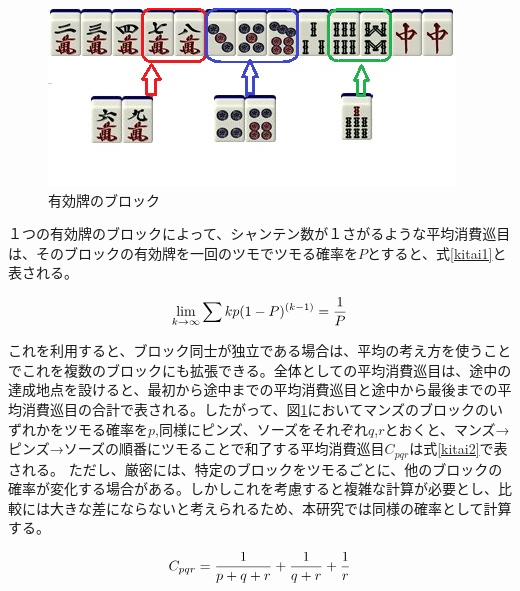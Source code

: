 \begin{figure}[h]
 \centering
 \includegraphics[keepaspectratio, scale=1,bb=0 0 320 194]
      {img/block.jpg}
 \caption{有効牌のブロック}
 \label{block}
\end{figure}

１つの有効牌のブロックによって、シャンテン数が１さがるような平均消費巡目は、そのブロックの有効牌を一回のツモでツモる確率を$P$とすると、式\ref{kitai1}と表される。\cite{gussan}

\begin{equation}
\label{kitai1}
\Large \lim _{k\rightarrow \infty }\sum { kp(1-P)^{(k-1)}} = \displaystyle \frac{1}{P}
\end{equation}

これを利用すると、ブロック同士が独立である場合は、平均の考え方を使うことでこれを複数のブロックにも拡張できる。全体としての平均消費巡目は、途中の達成地点を設けると、最初から途中までの平均消費巡目と途中から最後までの平均消費巡目の合計で表される。したがって、図\ref{block}においてマンズのブロックのいずれかをツモる確率を$p$,同様にピンズ、ソーズをそれぞれ$q$,$r$とおくと、マンズ→ピンズ→ソーズの順番にツモることで和了する平均消費巡目$C_{pqr}$は式\ref{kitai2}で表される。
ただし、厳密には、特定のブロックをツモるごとに、他のブロックの確率が変化する場合がある。しかしこれを考慮すると複雑な計算が必要とし、比較には大きな差にならないと考えられるため、本研究では同様の確率として計算する。

\begin{equation}
\label{kitai2}
\Large C_{pqr} = \displaystyle \frac{1}{p+q+r} + \displaystyle \frac{1}{q+r} + \displaystyle \frac{1}{r}
\end{equation}

